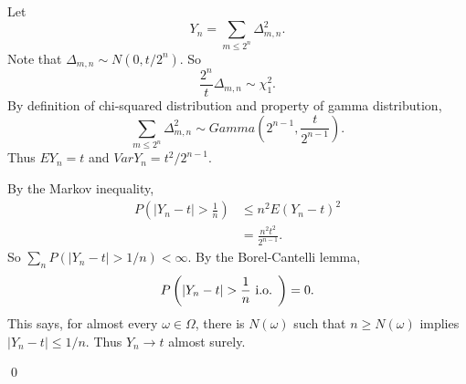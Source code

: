 \begin{problem}[7.1.6] \hfill

	Let
	\[
		Y_n = \sum_{m\le 2^n}\Delta^2_{m, n}.
	\]
	Note that $\Delta_{m, n} \sim N(0, t/2^n)$.
	So
	\[
		\frac{2^n}{t}\Delta_{m,n} \sim \chi^2_1.
	\]
	By definition of chi-squared distribution and property of gamma distribution,
	\[
		\sum_{m\le 2^n}\Delta^2_{m, n} \sim Gamma(2^{n-1}, \frac{t}{2^{n-1}}).
	\]
	Thus $EY_n = t$ and $Var Y_n = t^2/2^{n-1}$.

	By the Markov inequality,
	\[
		\begin{split}
			P\left( |Y_n - t| > \frac{1}{n} \right)
			&\le n^2 E(Y_n -t)^2 \\
			&= \frac{n^2 t^2}{2^{n-1}}.
		\end{split}
	\]
	So $\sum_n P(|Y_n - t| > 1/n) < \infty$.
	By the Borel-Cantelli lemma,
	\[
		P\left( |Y_n - t| > {1 \over n} \text{ i.o. } \right) = 0.
	\]
	This says, for almost every $\omega \in \Omega$, there is $N(\omega)$ such that
	$n \ge N(\omega)$ implies $|Y_n - t| \le 1/n$.
	Thus $Y_n \rightarrow t$ almost surely.
	
	\qed
\end{problem}
